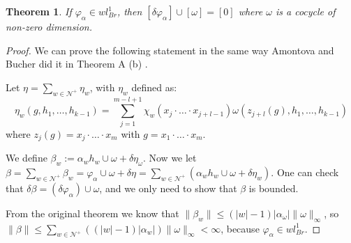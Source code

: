 \documentclass[leqno]{article}
\newtheorem*{theorem}{Theorem}
\newtheorem*{lemma}{Lemma}
\begin{document}
\begin{theorem} If $\varphi _\alpha \in wl^1_{Br}$, then $[\delta \varphi _\alpha ]\cup [\omega] =[0]$ where $\omega$ is a cocycle of non-zero dimension.
\end{theorem}
\begin{proof}
  We can prove the following statement in the same way Amontova and Bucher did it in Theorem A (b) \cite{amontova}.

Let $\eta = \sum_{w\in \mathcal{N}^+}\eta_w$, with $\eta_w$ defined as:
\[
  \eta_w (g, h_1, \ldots, h_{k-1}) = \sum_{j=1}^{m-l+1} \chi _w (x_j\cdot \ldots\cdot x_{j+l-1})\omega (z_{j+l}(g), h_1, \ldots, h_{k-1})
\] 
where $z_j(g)=x_j \cdot  \ldots \cdot x_m$ with $g = x_1\cdot \ldots \cdot x_m$.

We define $\beta _w := \alpha _wh_w\cup \omega +\delta \eta_\omega $. Now we let $\beta = \sum_{w\in \mathcal{N}^+} \beta _w = \varphi_\alpha \cup \omega +\delta \eta = \sum_{w\in \mathcal{N}^+}\left( \alpha _w h_w \cup \omega +\delta\eta_w \right)$. One can check that $\delta \beta = (\delta \varphi _\alpha )\cup \omega $, and we only need to show that $\beta $ is bounded.

From the original theorem we know that $\|\beta _w\| \le (|w|-1)|\alpha _\omega |\|\omega \|_{\infty}$, so $\|\beta \|\le \sum_{w\in \mathcal{N}^+}((|w|-1)|\alpha _w|)\|\omega \|_{\infty}<\infty$, because $\varphi _\alpha \in wl^1_{Br}$.
\end{proof}

\begin{comment}
\section{Some properties of cocycles}

\begin{lemma} Let  $k>0$ even. Then if  $\omega \in C^k(F, \mathbb{R})$ is a cocycle, $\lambda := \omega + A$, with $A\in \mathbb{R}$ is also a cocycle.
\end{lemma}
\begin{proof} 
  \begin{align*}
	&\delta \lambda (h_1, \ldots, h_{k+1}) = \lambda(h_2,\ldots,h_{k+1}) + \sum _{j=1}^k \lambda (h_1, \ldots, h_jh_{j+1}, \ldots, h(k+1)) - \lambda(h_1, \ldots, h_k) =  \\
	&= \omega (h_2,\ldots,h_{k+1}) + A + \sum _{j=1}^k( \omega (h_1, \ldots, h_jh_{j+1}, \ldots, h(k+1))+A) - \omega (h_1, \ldots, h_k) -A = \delta \omega (h_1, \ldots, h_{k+1}) = 0
  \end{align*}
\end{proof}
\end{comment}




\end{document}

